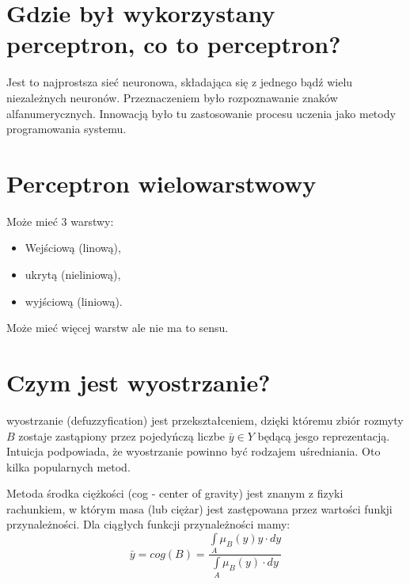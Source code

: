 \documentclass[a4paper,12pt]{article}
\begin{document}
\section{Gdzie był wykorzystany perceptron, co to perceptron?}
Jest to najprostsza sieć neuronowa, składająca się z jednego bądź wielu
niezależnych neuronów. Przeznaczeniem było rozpoznawanie znaków
alfanumerycznych. Innowacją było tu zastosowanie procesu uczenia jako
metody programowania systemu.

\section{Perceptron wielowarstwowy}
Może mieć 3 warstwy:
\begin{itemize}
    \item Wejściową (linową),
    \item ukrytą (nieliniową),
    \item wyjściową (liniową).
\end{itemize}
Może mieć więcej warstw ale nie ma to sensu. 
\section{Czym jest wyostrzanie?}
wyostrzanie (defuzzyfication) jest przekształceniem, dzięki któremu zbiór rozmyty
$B$ zostaje zastąpiony przez pojedyńczą liczbe $\bar{y} \in Y$ będącą jesgo reprezentacją.
Intuicja podpowiada, że wyostrzanie powinno być rodzajem uśredniania. Oto kilka popularnych metod.

Metoda środka ciężkości (cog - center of gravity) jest znanym z fizyki rachunkiem, w którym masa (lub ciężar) jest
zastępowana przez wartości funkji przynależności.
Dla ciągłych funkcji przynależności mamy:
\[
    \bar{y} = cog(B) = \frac{\int\limits_A{\mu_B (y)y} \cdot dy}{\int\limits_A{\mu_B (y)} \cdot dy}
\]
\end{document}
